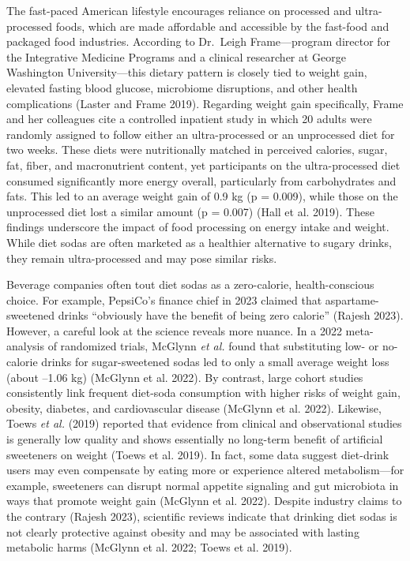 \documentclass[
  11pt,
]{article}
\begin{document}
The fast-paced American lifestyle encourages reliance on processed and
ultra-processed foods, which are made affordable and accessible by the
fast-food and packaged food industries. According to Dr.~Leigh
Frame---program director for the Integrative Medicine Programs and a
clinical researcher at George Washington University---this dietary
pattern is closely tied to weight gain, elevated fasting blood glucose,
microbiome disruptions, and other health complications (Laster and Frame
2019). Regarding weight gain specifically, Frame and her colleagues cite
a controlled inpatient study in which 20 adults were randomly assigned
to follow either an ultra-processed or an unprocessed diet for two
weeks. These diets were nutritionally matched in perceived calories,
sugar, fat, fiber, and macronutrient content, yet participants on the
ultra-processed diet consumed significantly more energy overall,
particularly from carbohydrates and fats. This led to an average weight
gain of 0.9 kg (p = 0.009), while those on the unprocessed diet lost a
similar amount (p = 0.007) (Hall et al. 2019). These findings underscore
the impact of food processing on energy intake and weight. While diet
sodas are often marketed as a healthier alternative to sugary drinks,
they remain ultra-processed and may pose similar risks.

Beverage companies often tout diet sodas as a zero-calorie,
health-conscious choice. For example, PepsiCo's finance chief in 2023
claimed that aspartame-sweetened drinks ``obviously have the benefit of
being zero calorie'' (Rajesh 2023). However, a careful look at the
science reveals more nuance. In a 2022 meta-analysis of randomized
trials, McGlynn \emph{et al.} found that substituting low- or no-calorie
drinks for sugar-sweetened sodas led to only a small average weight loss
(about --1.06 kg) (McGlynn et al. 2022). By contrast, large cohort
studies consistently link frequent diet-soda consumption with higher
risks of weight gain, obesity, diabetes, and cardiovascular disease
(McGlynn et al. 2022). Likewise, Toews \emph{et al.} (2019) reported
that evidence from clinical and observational studies is generally low
quality and shows essentially no long-term benefit of artificial
sweeteners on weight (Toews et al. 2019). In fact, some data suggest
diet-drink users may even compensate by eating more or experience
altered metabolism---for example, sweeteners can disrupt normal appetite
signaling and gut microbiota in ways that promote weight gain (McGlynn
et al. 2022). Despite industry claims to the contrary (Rajesh 2023),
scientific reviews indicate that drinking diet sodas is not clearly
protective against obesity and may be associated with lasting metabolic
harms (McGlynn et al. 2022; Toews et al. 2019).
\end{document}
